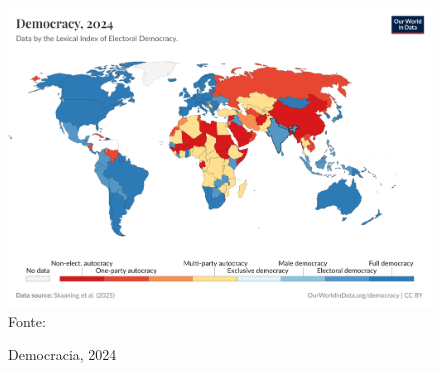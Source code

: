 \begin{figure}[htbp]
    \centering
    \caption{Democracia, 2024}
    \includegraphics[width=1\linewidth]{figuras/democracia/political-regime-lexical.png}
    \label{fig:political-regime-lexical}
    \footnotesize{Fonte: \cite{political_regime_lexical}}
\end{figure}
